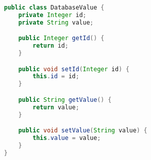 
\begin{lstlisting}[language=Java, caption={Example of object loading from database}, label={code:model}]
public class DatabaseValue {
    private Integer id;
    private String value;

    public Integer getId() {
        return id;
    }

    public void setId(Integer id) {
        this.id = id;
    }

    public String getValue() {
        return value;
    }

    public void setValue(String value) {
        this.value = value;
    }
}
\end{lstlisting}
